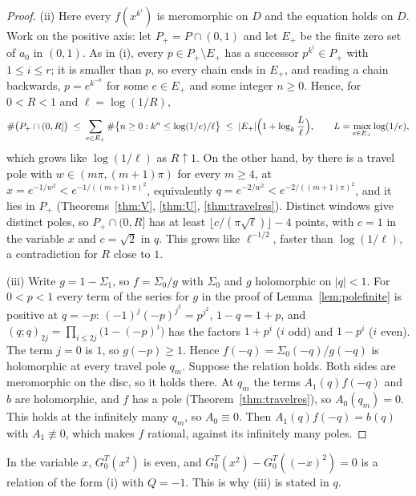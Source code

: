 \documentclass[11pt]{article}
\theoremstyle{plain}
\theoremstyle{definition}
\theoremstyle{remark}
\theoremstyle{plain}\newtheorem*{maintheorem}{Main Theorem}
\begin{document}
\begin{proof}
(ii) Here every $f(x^{k^i})$ is meromorphic on $D$ and the equation holds on $D$. Work on the
positive axis: let $P_+=P\cap(0,1)$ and let $E_+$ be the finite zero set of $a_0$ in $(0,1)$. As in
(i), every $p\in P_+\setminus E_+$ has a successor $p^{k^i}\in P_+$ with $1\le i\le r$; it is
smaller than $p$, so every chain ends in $E_+$, and reading a chain backwards,
$p=e^{k^{-n}}$ for some $e\in E_+$ and some integer $n\ge0$. Hence, for $0<R<1$ and
$\ell=\log(1/R)$,
\[
   \#\bigl(P_+\cap(0,R]\bigr)\;\le\;\sum_{e\in E_+}\#\bigl\{n\ge0:k^n\le\log(1/e)/\ell\bigr\}
   \;\le\;|E_+|\Bigl(1+\log_k\frac L\ell\Bigr),\qquad L=\max_{e\in E_+}\log(1/e),
\]
which grows like $\log(1/\ell)$ as $R\uparrow1$. On the other hand, by {\cite[Lemma ``infinitude and accumulation of the travel poles'', \textup{lem:infpoles}]{Bonfioli2026bB}}
there is a travel pole with $w\in(m\pi,(m+1)\pi)$ for every $m\ge4$, at
$x=e^{-1/w^2}<e^{-1/((m+1)\pi)^2}$, equivalently $q=e^{-2/w^2}<e^{-2/((m+1)\pi)^2}$, and it lies in
$P_+$ (Theorems~\ref{thm:V}, \ref{thm:U}, \ref{thm:travelres}). Distinct windows give distinct
poles, so $P_+\cap(0,R]$ has at least $\lfloor c/(\pi\sqrt\ell)\rfloor-4$ points, with $c=1$ in the
variable $x$ and $c=\sqrt2$ in $q$. This grows like $\ell^{-1/2}$, faster than $\log(1/\ell)$, a
contradiction for $R$ close to $1$.

(iii) Write $g=1-\Sigma_1$, so $f=\Sigma_0/g$ with $\Sigma_0$ and $g$ holomorphic on $|q|<1$. For
$0<p<1$ every term of the series for $g$ in the proof of Lemma~\ref{lem:polefinite} is positive at
$q=-p$: $(-1)^j(-p)^{j^2}=p^{j^2}$, $1-q=1+p$, and
$(q;q)_{2j}=\prod_{i\le2j}\bigl(1-(-p)^i\bigr)$ has the factors $1+p^i$ ($i$ odd) and $1-p^i$
($i$ even). The term $j=0$ is $1$, so $g(-p)\ge1$. Hence $f(-q)=\Sigma_0(-q)/g(-q)$ is holomorphic
at every travel pole $q_m$. Suppose the relation holds. Both sides are meromorphic on the disc, so it
holds there. At $q_m$ the terms $A_1(q)f(-q)$ and $b$ are holomorphic, and $f$ has a pole
(Theorem~\ref{thm:travelres}), so $A_0(q_m)=0$. This holds at the infinitely many $q_m$, so
$A_0\equiv0$. Then $A_1(q)f(-q)=b(q)$ with $A_1\not\equiv0$, which makes $f$ rational, against its
infinitely many poles.
\end{proof}

\noindent In the variable $x$, $G^T_0(x^2)$ is even, and $G^T_0(x^2)-G^T_0((-x)^2)=0$ is a
relation of the form (i) with $Q=-1$. This is why (iii) is stated in $q$.
\end{document}
